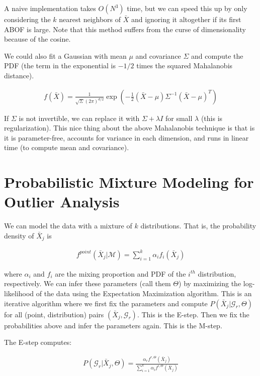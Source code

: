 \documentclass[a4paper]{article}
\begin{document}
A naive implementation takes $O(N^3)$ time, but we can speed this up by only
considering the $k$ nearest neighbors of $\bar{X}$ and ignoring it altogether if
its first ABOF is large. Note that this method suffers from the curse of
dimensionality because of the cosine.

We could also fit a Gaussian with mean $\mu$ and covariance $\Sigma$ and compute
the PDF (the term in the exponential is $-1/2$ times the squared
Mahalanobis distance).

\begin{align}
  f(\bar{X}) = \frac{1}{\sqrt{\Sigma} (2 \pi)^{d/2}} \exp{(
  - \frac{1}{2} (\bar{X} - \mu)\Sigma^{-1}(\bar{X} - \mu)^T
  )}
\end{align}

If $\Sigma$ is not invertible, we can replace it with $\Sigma + \lambda I$ for
small $\lambda$ (this is regularization). This nice thing about the above
Mahalanobis technique is that is it is parameter-free, accounts for variance
in each dimension, and runs in linear time (to compute mean and covariance).

\section{Probabilistic Mixture Modeling for Outlier Analysis}
We can model the data with a mixture of $k$ distributions. That is, the
probability density of $\bar{X}_j$ is

\begin{align}
  f^{point}(\bar{X}_j | \mathcal{M}) = \sum_{i=1}^{k}{\alpha_i f_i(\bar{X}_j)}
\end{align}

where $\alpha_i$ and $f_i$ are the mixing proportion and PDF of the $i^{th}$
distribution, respectively. We can infer these parameters (call them $\Theta$)
by maximizing the log-likelihood of the data using the Expectation Maximization
algorithm. This is an iterative algorithm where we first fix the parameters and
compute $P(\bar{X}_j | \mathcal{G}_r, \Theta)$ for all (point, distribution)
pairs $(\bar{X}_j, \mathcal{G}_r)$. This is the E-step. Then we fix the
probabilities above and infer the parameters again. This is the M-step.

The E-step computes:

\begin{align}
  P(\mathcal{G}_r | \bar{X}_j, \Theta)
    = \frac{\alpha_r f^{r, \Theta}(\bar{X}_j)}{
    \sum_{i=1}^{k}{\alpha_i f^{i, \Theta}(\bar{X}_j)}}
\end{align}
\end{document}
